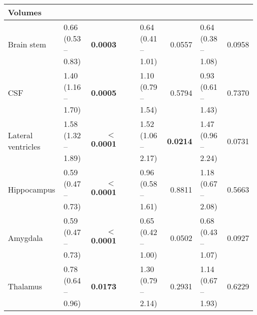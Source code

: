 \begin{sidewaystable}
{\begin{tabular}{|l|lr|lr|lr|lr|}
\hline
\multicolumn{1}{|l}{\textbf{Volumes}} &  & \multicolumn{1}{l}{} &  & \multicolumn{1}{l}{} &  & \multicolumn{1}{l}{} &  &  \\ 
\hline
Brain stem & \textcolor[rgb]{0.2,0.2,0.2}{0.66 (0.53 -- 0.83)} & \textcolor[rgb]{0.2,0.2,0.2}{\textbf{0.0003}} & {\cellcolor[rgb]{0.753,0.753,0.753}} & {\cellcolor[rgb]{0.753,0.753,0.753}} & \textcolor[rgb]{0.2,0.2,0.2}{0.64 (0.41 -- 1.01)} & \textcolor[rgb]{0.2,0.2,0.2}{0.0557} & \textcolor[rgb]{0.2,0.2,0.2}{0.64 (0.38 -- 1.08)} & \textcolor[rgb]{0.2,0.2,0.2}{0.0958} \\ 
\hline
CSF & \textcolor[rgb]{0.2,0.2,0.2}{1.40 (1.16 -- 1.70)} & \textcolor[rgb]{0.2,0.2,0.2}{\textbf{0.0005}} & {\cellcolor[rgb]{0.753,0.753,0.753}} & {\cellcolor[rgb]{0.753,0.753,0.753}} & \textcolor[rgb]{0.2,0.2,0.2}{1.10 (0.79 -- 1.54)} & \textcolor[rgb]{0.2,0.2,0.2}{0.5794} & \textcolor[rgb]{0.2,0.2,0.2}{0.93 (0.61 -- 1.43)} & \textcolor[rgb]{0.2,0.2,0.2}{0.7370} \\ 
\hline
Lateral ventricles & \textcolor[rgb]{0.2,0.2,0.2}{1.58 (1.32 -- 1.89)} & \textbf{$<$0.0001} & {\cellcolor[rgb]{0.753,0.753,0.753}} & {\cellcolor[rgb]{0.753,0.753,0.753}} & \textcolor[rgb]{0.2,0.2,0.2}{1.52 (1.06 -- 2.17)} & \textcolor[rgb]{0.2,0.2,0.2}{\textbf{0.0214}} & \textcolor[rgb]{0.2,0.2,0.2}{1.47 (0.96 -- 2.24)} & \textcolor[rgb]{0.2,0.2,0.2}{0.0731} \\ 
\hline
Hippocampus & \textcolor[rgb]{0.2,0.2,0.2}{0.59 (0.47 -- 0.73)} & \textbf{$<$0.0001} & {\cellcolor[rgb]{0.753,0.753,0.753}} & {\cellcolor[rgb]{0.753,0.753,0.753}} & \textcolor[rgb]{0.2,0.2,0.2}{0.96 (0.58 -- 1.61)} & \textcolor[rgb]{0.2,0.2,0.2}{0.8811} & \textcolor[rgb]{0.2,0.2,0.2}{1.18 (0.67 -- 2.08)} & \textcolor[rgb]{0.2,0.2,0.2}{0.5663} \\ 
\hline
Amygdala & \textcolor[rgb]{0.2,0.2,0.2}{0.59 (0.47 -- 0.73)} & \textbf{$<$0.0001} & {\cellcolor[rgb]{0.753,0.753,0.753}} & {\cellcolor[rgb]{0.753,0.753,0.753}} & \textcolor[rgb]{0.2,0.2,0.2}{0.65 (0.42 -- 1.00)} & \textcolor[rgb]{0.2,0.2,0.2}{0.0502} & \textcolor[rgb]{0.2,0.2,0.2}{0.68 (0.43 -- 1.07)} & \textcolor[rgb]{0.2,0.2,0.2}{0.0927} \\ 
\hline
Thalamus & \textcolor[rgb]{0.2,0.2,0.2}{0.78 (0.64 -- 0.96)} & \textcolor[rgb]{0.2,0.2,0.2}{\textbf{0.0173}} & {\cellcolor[rgb]{0.753,0.753,0.753}} & {\cellcolor[rgb]{0.753,0.753,0.753}} & \textcolor[rgb]{0.2,0.2,0.2}{1.30 (0.79 -- 2.14)} & \textcolor[rgb]{0.2,0.2,0.2}{0.2931} & \textcolor[rgb]{0.2,0.2,0.2}{1.14 (0.67 -- 1.93)} & \textcolor[rgb]{0.2,0.2,0.2}{0.6229} \\ 

\end{tabular}}
\end{sidewaystable}

